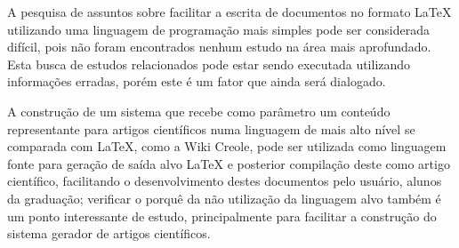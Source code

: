 \documentclass{article}
\begin{document}
A pesquisa de assuntos sobre facilitar a escrita de documentos no formato
\LaTeX{} utilizando uma linguagem de programação mais simples pode ser
considerada difícil, pois não foram encontrados nenhum estudo na área mais
aprofundado. Esta busca de estudos relacionados pode estar sendo executada
utilizando informações erradas, porém este é um fator que ainda será dialogado.

A construção de um sistema que recebe como parâmetro um conteúdo representante
para artigos científicos numa linguagem de mais alto nível se comparada com
\LaTeX{}, como a Wiki Creole, pode ser utilizada como linguagem fonte para
geração de saída alvo \LaTeX{} e posterior compilação deste como artigo
científico, facilitando o desenvolvimento destes documentos pelo usuário, alunos
da graduação; verificar o porquê da não utilização da linguagem alvo também é um
ponto interessante de estudo, principalmente para facilitar a construção do
sistema gerador de artigos científicos.



\end{document}
